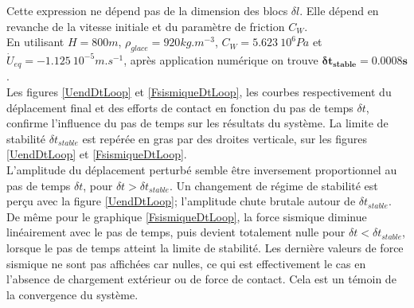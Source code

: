 \documentclass[11pt, a4paper]{article}
\begin{document}
Cette expression ne dépend pas de la dimension des blocs $\delta l$. Elle dépend en revanche de la vitesse initiale et du paramètre de friction $C_W$.
\\ 

En utilisant $H = 800m$, $\rho_{glace} = 920 kg.m^{-3}$, $C_W = 5.623 \ 10^6 Pa$ et $\dot{U}_{eq} = -1.125 \ 10^{-5}m.s^{-1}$, après application numérique on trouve $\mathbf{\delta t_{stable} = 0.0008s}$. 
\\

Les figures \ref{UendDtLoop} et \ref{FsismiqueDtLoop}, les courbes respectivement du déplacement final et des efforts de contact en fonction du pas de temps $\delta t$, confirme l'influence du pas de temps sur les résultats du système. La limite de stabilité $\delta t_{stable}$ est repérée en gras par des droites verticale, sur les figures \ref{UendDtLoop} et \ref{FsismiqueDtLoop}. 
\\

L'amplitude du déplacement perturbé semble être inversement proportionnel au pas de temps $\delta t$, pour $\delta t > \delta t_{stable}$. Un changement de régime de stabilité est perçu avec la figure \ref{UendDtLoop}; l'amplitude chute brutale autour de $\delta t_{stable}$. De même pour le graphique \ref{FsismiqueDtLoop}, la force sismique diminue linéairement avec le pas de temps, puis devient totalement nulle pour $\delta t < \delta t_{stable}$, lorsque le pas de temps atteint la limite de stabilité. Les dernière valeurs de force sismique ne sont pas affichées car nulles, ce qui est effectivement le cas en l'absence de chargement extérieur ou de force de contact. Cela est un témoin de la convergence du système.
\\
\end{document}
